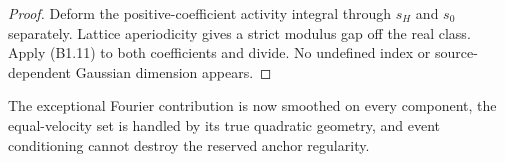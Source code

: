 \begin{proof}
Deform the positive-coefficient activity integral through $s_H$ and $s_0$
separately.  Lattice aperiodicity gives a strict modulus gap off the real
class.  Apply (B1.11) to both coefficients and divide.  No undefined index or
source-dependent Gaussian dimension appears.
\end{proof}

The exceptional Fourier contribution is now smoothed on every component, the
equal-velocity set is handled by its true quadratic geometry, and event
conditioning cannot destroy the reserved anchor regularity.
